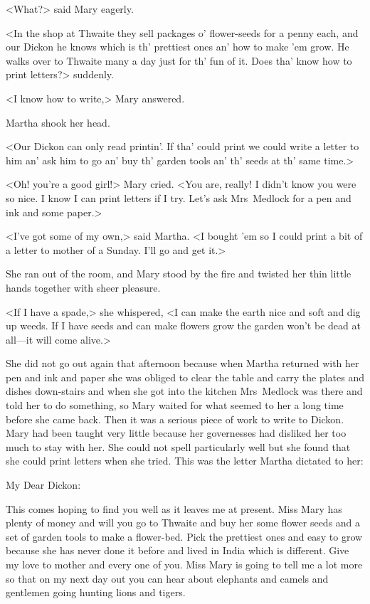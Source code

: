 <What?> said Mary eagerly.

<In the shop at Thwaite they sell packages o' flower-seeds for a penny each, and our Dickon he knows which is th' prettiest ones an' how to make 'em grow. He walks over to Thwaite many a day just for th' fun of it. Does tha' know how to print letters?> suddenly.

<I know how to write,> Mary answered.

Martha shook her head.

<Our Dickon can only read printin'. If tha' could print we could write a letter to him an' ask him to go an' buy th' garden tools an' th' seeds at th' same time.>

<Oh! you're a good girl!> Mary cried. <You are, really! I didn't know you were so nice. I know I can print letters if I try. Let's ask Mrs~Medlock for a pen and ink and some paper.>

<I've got some of my own,> said Martha. <I bought 'em so I could print a bit of a letter to mother of a Sunday. I'll go and get it.>

She ran out of the room, and Mary stood by the fire and twisted her thin little hands together with sheer pleasure.

<If I have a spade,> she whispered, <I can make the earth nice and soft and dig up weeds. If I have seeds and can make flowers grow the garden won't be dead at all—it will come alive.>

She did not go out again that afternoon because when Martha returned with her pen and ink and paper she was obliged to clear the table and carry the plates and dishes down-stairs and when she got into the kitchen Mrs~Medlock was there and told her to do something, so Mary waited for what seemed to her a long time before she came back. Then it was a serious piece of work to write to Dickon. Mary had been taught very little because her governesses had disliked her too much to stay with her. She could not spell particularly well but she found that she could print letters when she tried. This was the letter Martha dictated to her:

\begin{mail}{}{My Dear Dickon:}

This comes hoping to find you well as it leaves me at present. Miss Mary has plenty of money and will you go to Thwaite and buy her some flower seeds and a set of garden tools to make a flower-bed. Pick the prettiest ones and easy to grow because she has never done it before and lived in India which is different. Give my love to mother and every one of you. Miss Mary is going to tell me a lot more so that on my next day out you can hear about elephants and camels and gentlemen going hunting lions and tigers.

\end{mail}


